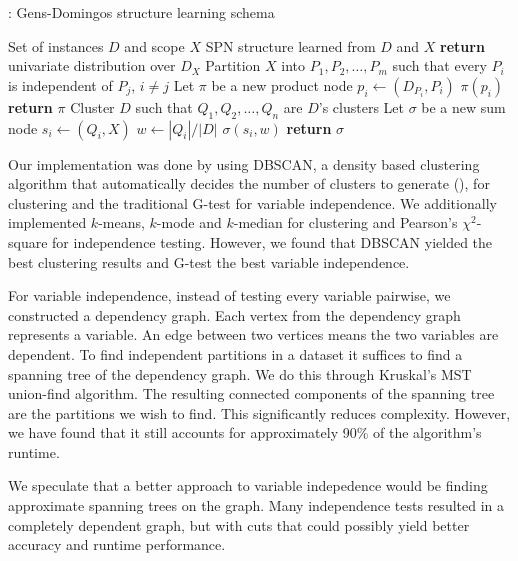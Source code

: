 \begin{algorithm}[H]
  \caption{: Gens-Domingos structure learning schema}
  \begin{algorithmic}[1]
    \Require Set of instances $D$ and scope $X$
    \Ensure SPN structure learned from $D$ and $X$
      \State \textbf{return} univariate distribution over $D_X$
    \Else%
      \State Partition $X$ into $P_1,P_2,\ldots,P_m$ such that every $P_i$ is independent of $P_j$,
        $i\neq j$
        \State Let $\pi$ be a new product node
          \State $p_i\gets$$(D_{P_i}, P_i)$
          \State $\pi$$(p_i)$
        \EndFor%
        \State \textbf{return} $\pi$
      \Else%
        \State Cluster $D$ such that $Q_1,Q_2,\ldots,Q_n$ are $D$'s clusters
        \State Let $\sigma$ be a new sum node
          \State $s_i\gets$$(Q_i, X)$
          \State $w\gets |Q_i|/|D|$
          \State $\sigma$$(s_i, w)$ 
        \EndFor%
        \State \textbf{return} $\sigma$
      \EndIf%
    \EndIf%
  \end{algorithmic}
\end{algorithm}

Our implementation was done by using DBSCAN, a density based clustering algorithm that
automatically decides the number of clusters to generate (\cite{dbscan}), for clustering and the
traditional G-test for variable independence. We additionally implemented $k$-means, $k$-mode and
$k$-median for clustering and Pearson's $\chi^2$-square for independence testing. However, we found
that DBSCAN yielded the best clustering results and G-test the best variable independence.

For variable independence, instead of testing every variable pairwise, we constructed a dependency
graph. Each vertex from the dependency graph represents a variable. An edge between two vertices
means the two variables are dependent. To find independent partitions in a dataset it suffices to
find a spanning tree of the dependency graph. We do this through Kruskal's MST union-find
algorithm. The resulting connected components of the spanning tree are the partitions we wish to
find. This significantly reduces complexity. However, we have found that it still accounts for
approximately 90\% of the algorithm's runtime.

We speculate that a better approach to variable indepedence would be finding approximate spanning
trees on the graph. Many independence tests resulted in a completely dependent graph, but with
cuts that could possibly yield better accuracy and runtime performance.

